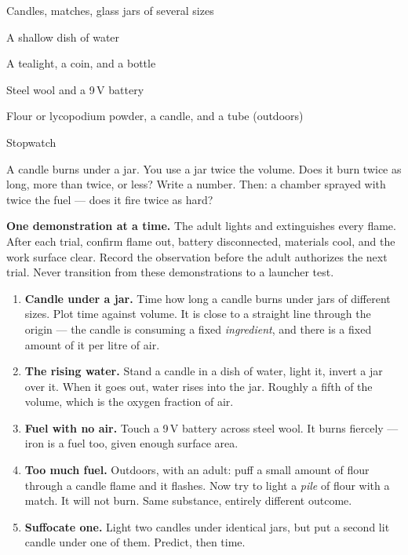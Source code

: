 



\begin{materials}
\item Candles, matches, glass jars of several sizes
\item A shallow dish of water
\item A tealight, a coin, and a bottle
\item Steel wool and a 9\,V battery
\item Flour or lycopodium powder, a candle, and a tube (outdoors)
\item Stopwatch
\end{materials}

\begin{predict}
A candle burns under a jar. You use a jar twice the volume. Does it burn twice
as long, more than twice, or less? Write a number. Then: a chamber sprayed with
twice the fuel --- does it fire twice as hard?
\end{predict}
\combustionplate

\begin{telosframe}
\textbf{One demonstration at a time.} The adult lights and extinguishes every
flame. After each trial, confirm flame out, battery disconnected, materials
cool, and the work surface clear. Record the observation before the adult
authorizes the next trial. Never transition from these demonstrations to a
launcher test.
\end{telosframe}
\begin{enumerate}
\item \textbf{Candle under a jar.} Time how long a candle burns under jars of different sizes. Plot time against volume. It is close to a straight line through the origin --- the candle is consuming a fixed \emph{ingredient}, and there is a fixed amount of it per litre of air.
\item \textbf{The rising water.} Stand a candle in a dish of water, light it, invert a jar over it. When it goes out, water rises into the jar. Roughly a fifth of the volume, which is the oxygen fraction of air.
\item \textbf{Fuel with no air.} Touch a 9\,V battery across steel wool. It burns fiercely --- iron is a fuel too, given enough surface area.
\item \textbf{Too much fuel.} Outdoors, with an adult: puff a small amount of flour through a candle flame and it flashes. Now try to light a \emph{pile} of flour with a match. It will not burn. Same substance, entirely different outcome.
\item \textbf{Suffocate one.} Light two candles under identical jars, but put a second lit candle under one of them. Predict, then time.
\end{enumerate}

